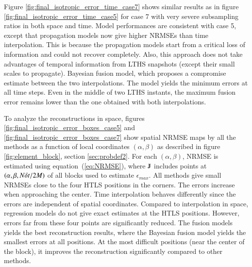 Figure \ref{fig:final_isotropic_error_time_case7} shows similar results as in figure \ref{fig:final_isotropic_error_time_case5} for case 7 with very severe subsampling ratios in both space and time. Model performances are consistent with case 5, except that propagation models now give higher NRMSEs than time interpolation. This is because the propagation models start from a critical loss of information and could not recover completely. Also, this approach does not take advantages of temporal information from LTHS snapshots (except their small scales to propagate). Bayesian fusion model, which proposes a compromise estimate between the two interpolations. The model yields the minimum errors at all time steps. Even in the middle of two LTHS instants, the maximum fusion error remains lower than the one obtained with both interpolations. 

To analyze the reconstructions in space, figures \ref{fig:final_isotropic_error_boxes_case5} and \ref{fig:final_isotropic_error_boxes_case7} show spatial NRMSE maps by all the methods as a function of local coordinates $ (\alpha,\beta) $ as described in figure \ref{fig:element_block}, section \ref{sec:probdef2}. For each $ (\alpha,\beta) $, NRMSE is estimated using equation~(\ref{eq:NRMSE}), where $ \varmathbb{J} $ includes points at $ (\alpha,\beta,N \delta t/2 M) $ of all blocks used to estimate $ \epsilon_{max} $. All methods give small NRMSEs close to the four HTLS positions in the corners. The errors increase when approaching the center. Time interpolation behaves differently since the errors are independent of spatial coordinates. Compared to interpolation in space, regression models do not give exact estimates at the HTLS positions. However, errors far from these four points are significantly reduced. The fusion models yields the best reconstruction results, where the Bayesian fusion model yields the smallest errors at all positions. At the most difficult positions (near the center of the block), it improves the reconstruction significantly compared to other methods. 


